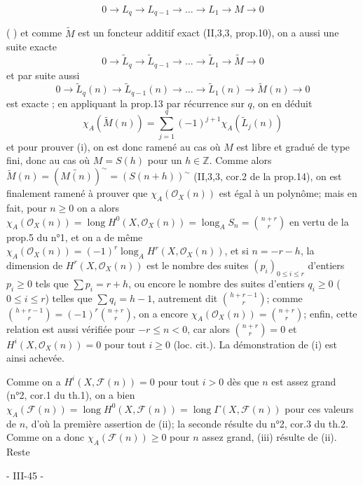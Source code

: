 $$0 \to L_q \to L_{q-1} \to \dots \to L_1 \to M \to 0$$

\newpage


(
) et comme $\widetilde{M}$ est un foncteur additif exact (II,3,3, prop.10), on a aussi une suite exacte
$$0 \to \widetilde{L}_q \to \widetilde{L}_{q-1} \to \dots \to \widetilde{L}_1 \to \widetilde{M} \to 0$$
et par suite aussi
$$0 \to \widetilde{L}_q(n) \to \widetilde{L}_{q-1}(n) \to \dots \to \widetilde{L}_1(n) \to \widetilde{M}(n) \to 0$$
est exacte ; en appliquant la prop.13 par récurrence sur $q$, on en déduit
$$\chi_A(\widetilde{M}(n)) = \sum_{j=1}^q (-1)^{j+1} \chi_A(\widetilde{L}_j(n))$$
et pour prouver (i), on est donc ramené au cas où $M$ est libre et gradué de type fini, donc au cas où $M=S(h)$ pour un $h \in \mathbb{Z}$. Comme alors $\widetilde{M}(n) = (\widetilde{M(n)})^{\sim} = (S(n+h))^{\sim}$ (II,3,3, cor.2 de la prop.14), on est finalement ramené à prouver que $\chi_A(\mathcal{O}_X(n))$ est égal à un polynôme; mais en fait, pour $n \ge 0$ on a alors $\chi_A(\mathcal{O}_X(n)) = \operatorname{long} H^0(X, \mathcal{O}_X(n)) = \operatorname{long}_A S_n = \binom{n+r}{r}$ en vertu de la prop.5 du n°1, et on a de même $\chi_A(\mathcal{O}_X(n)) = (-1)^r \operatorname{long}_A H^r(X, \mathcal{O}_X(n))$, et si $n = -r-h$, la dimension de $H^r(X, \mathcal{O}_X(n))$ est le nombre des suites $(p_i)_{0 \le i \le r}$ d'entiers $p_i \ge 0$ tels que $\sum p_i = r+h$, ou encore le nombre des suites d'entiers $q_i \ge 0$ ($0 \le i \le r$) telles que $\sum q_i = h-1$, autrement dit $\binom{h+r-1}{r}$; comme $\binom{h+r-1}{r} = (-1)^r \binom{n+r}{r}$, on a encore $\chi_A(\mathcal{O}_X(n)) = \binom{n+r}{r}$; enfin, cette relation est aussi vérifiée pour $-r \le n < 0$, car alors $\binom{n+r}{r}=0$ et $H^i(X, \mathcal{O}_X(n)) = 0$ pour tout $i \ge 0$ (loc. cit.). La démonstration de (i) est ainsi achevée.

Comme on a $H^i(X, \mathcal{F}(n)) = 0$ pour tout $i > 0$ dès que $n$ est assez grand (n°2, cor.1 du th.1), on a bien $\chi_A(\mathcal{F}(n)) = \operatorname{long} H^0(X, \mathcal{F}(n)) = \operatorname{long} \Gamma(X, \mathcal{F}(n))$ pour ces valeurs de $n$, d'où la première assertion de (ii); la seconde résulte du n°2, cor.3 du th.2. Comme on a donc $\chi_A(\mathcal{F}(n)) \ge 0$ pour $n$ assez grand, (iii) résulte de (ii). Reste

\newpage


- III-45 -

